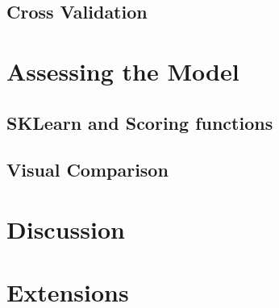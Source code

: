 \documentclass{beamer}
\begin{document}
\subsection{Cross Validation}
\section{Assessing the Model}
\frame{}
\subsection{SKLearn and  Scoring functions}
\subsection{Visual Comparison}
\section{Discussion}
\section{Extensions}
\end{document}
